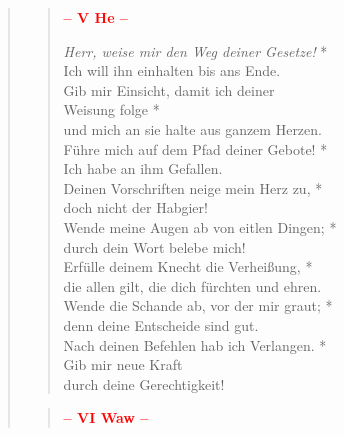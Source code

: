 

\begin{quote}
\begin{verse}

\begin{center}
 \textcolor{red}{\normalsize\bf – V He –}\\
\end{center} 

{\textit{Herr, weise mir den Weg deiner Gesetze!}} *\\
Ich will ihn einhalten bis ans Ende.\\ 
\vin Gib mir Einsicht, damit ich deiner\\ 
\vin Weisung folge *\\ 
\vin und mich an sie halte aus ganzem Herzen.\\
Führe mich auf dem Pfad deiner Gebote! *\\
Ich habe an ihm Gefallen.\\ 
\vin Deinen Vorschriften neige mein Herz zu, *\\ 
\vin doch nicht der Habgier!\\
Wende meine Augen ab von eitlen Dingen; *\\
durch dein Wort belebe mich!\\ 
\vin Erfülle deinem Knecht die Verheißung, *\\ 
\vin die allen gilt, die dich fürchten und ehren.\\
Wende die Schande ab, vor der mir graut; *\\
denn deine Entscheide sind gut.\\ 
\vin Nach deinen Befehlen hab ich Verlangen. *\\ 
\vin Gib mir neue Kraft\\ 
\vin durch deine Gerechtigkeit!\\   
\end{verse}

\begin{verse}

\begin{center}
 \textcolor{red}{\normalsize\bf – VI Waw –}\\
\end{center} 


\end{verse}
\end{quote}
